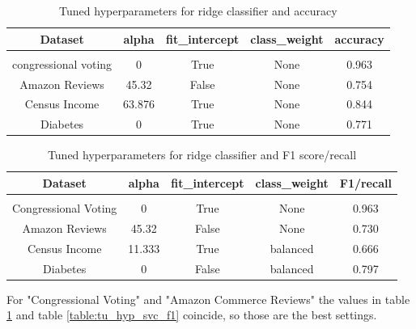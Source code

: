 \documentclass[a4paper,10pt]{article}
\begin{document}
\begin{table}[h!]
    \centering
    \begin{tabular}{|c|c|c|c|c|}
    \hline
    Dataset & \textsf{alpha} & \textsf{fit\_intercept} &  \textsf{class\_weight} &  accuracy \\
    \hline
    \multicolumn{5}{c}{\vspace{-0.4cm}} \\ %
    \hline
    congressional voting & 0 & True & None & 0.963 \\%
    \hline
    Amazon Reviews & 45.32 & False & None &  0.754 \\%
    \hline
    Census Income & 63.876 & True & None &  0.844 \\%
    \hline
    Diabetes & 0 & True & None &  0.771 \\%
    \hline
    \end{tabular}
    \caption{Tuned hyperparameters for ridge classifier and accuracy} 
    \label{table:tu_hyp_ridge_ac}
    \end{table}

\begin{table}[h!]
    \centering
    \begin{tabular}{|c|c|c|c|c|}
    \hline
    Dataset & \textsf{alpha} & \textsf{fit\_intercept} &  \textsf{class\_weight} & F1/recall \\
    \hline
    \multicolumn{5}{c}{\vspace{-0.4cm}} \\ %
    \hline
    Congressional Voting & 0 & True & None & 0.963 \\%
    \hline
    Amazon Reviews & 45.32 & False & None &  0.730 \\%
    \hline
    Census Income & 11.333 & True & balanced & 0.666 \\%
    \hline
    Diabetes & 0 & False & balanced & 0.797 \\%
    \hline
    \end{tabular}
    \caption{Tuned hyperparameters for ridge classifier and F1 score/recall} 
    \label{table:tu_hyp_ridge_f1}
    \end{table}

For "Congressional Voting" and "Amazon Commerce Reviews" the values in table \ref{table:tu_hyp_ridge_ac} and table \ref{table:tu_hyp_svc_f1} coincide, so those are the best settings. 
\end{document}
